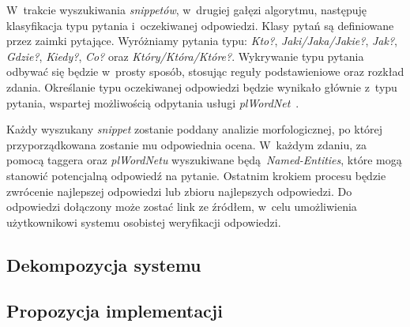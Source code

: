 W~trakcie wyszukiwania \emph{snippetów}, w~drugiej gałęzi algorytmu, następuję klasyfikacja typu pytania i~oczekiwanej odpowiedzi. Klasy pytań są definiowane przez zaimki pytające. Wyróżniamy pytania typu: \emph{Kto?}, \emph{Jaki/Jaka/Jakie?}, \emph{Jak?}, \emph{Gdzie?}, \emph{Kiedy?}, \emph{Co?} oraz \emph{Który/Która/Które?}. Wykrywanie typu pytania odbywać się będzie w~prosty sposób, stosując reguły podstawieniowe oraz rozkład zdania. Określanie typu oczekiwanej odpowiedzi będzie wynikało głównie z~typu pytania, wspartej możliwością odpytania usługi \emph{plWordNet}~\cite{MazPiaRudSzpaKedz:16}.

Każdy wyszukany \emph{snippet} zostanie poddany analizie morfologicznej, po której przyporządkowana zostanie mu odpowiednia ocena. W~każdym zdaniu, za pomocą taggera oraz \emph{plWordNetu} wyszukiwane będą \emph{Named-Entities}, które mogą stanowić potencjalną odpowiedź na pytanie. Ostatnim krokiem procesu będzie zwrócenie najlepszej odpowiedzi lub zbioru najlepszych odpowiedzi. Do odpowiedzi dołączony może zostać link ze źródłem, w~celu umożliwienia użytkownikowi systemu osobistej weryfikacji odpowiedzi.

\subsection{Dekompozycja systemu}

\subsection{Propozycja implementacji}
